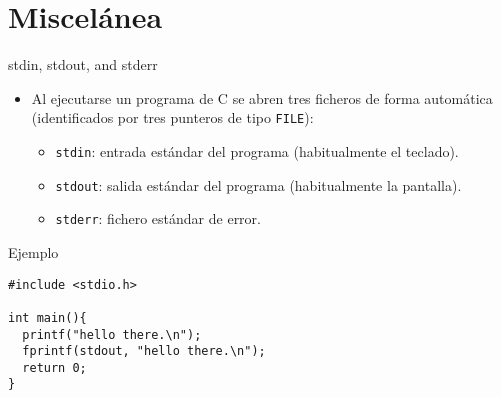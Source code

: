 \documentclass[usenames,svgnames,dvipsnames, aspectratio=169]{beamer}
\begin{document}
\section{Miscelánea}
\label{sec:orgbed5c56}
\begin{frame}[label={sec:orgbe6fd7d},fragile]{stdin, stdout, and stderr}
 \begin{itemize}
\item Al ejecutarse un programa de C se abren tres ficheros de forma automática (identificados por tres punteros de tipo \texttt{FILE}):

\begin{itemize}
\item \texttt{stdin}: entrada estándar del programa (habitualmente el teclado).

\item \texttt{stdout}: salida estándar del programa (habitualmente la pantalla).

\item \texttt{stderr}: fichero estándar de error.
\end{itemize}
\end{itemize}

\begin{block}{Ejemplo}
\lstset{language=C,label= ,caption= ,captionpos=b,numbers=none}
\begin{lstlisting}
#include <stdio.h>

int main(){
  printf("hello there.\n");
  fprintf(stdout, "hello there.\n");
  return 0;
}
\end{lstlisting}
\end{block}
\end{frame}
\end{document}
